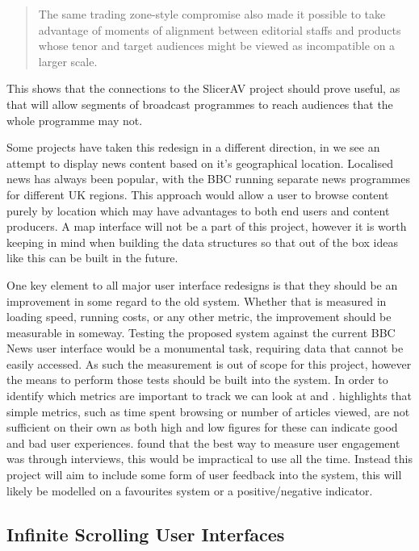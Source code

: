 \documentclass[12pt,titlepage]{article}
\begin{document}
  \begin{quote}
    The same trading zone-style compromise also made it possible to take advantage
    of moments of alignment between editorial staffs and products whose tenor and
    target audiences might be viewed as incompatible on a larger scale.
  \end{quote}

  This shows that the connections to the SlicerAV project should prove useful,
  as that will allow segments of broadcast programmes to reach audiences that
  the whole programme may not.

  Some projects have taken this redesign in a different direction, in
  \cite{newsstand} we see an attempt to display news content based on it's
  geographical location. Localised news has always been popular, with the BBC
  running separate news programmes for different UK regions. This approach would
  allow a user to browse content purely by location which may have advantages to
  both end users and content producers. A map interface will not be a part of
  this project, however it is worth keeping in mind when building the data
  structures so that out of the box ideas like this can be built in the future.

  One key element to all major user interface redesigns is that they should be
  an improvement in some regard to the old system. Whether that is measured in
  loading speed, running costs, or any other metric, the improvement should be
  measurable in someway. Testing the proposed system against the current BBC
  News user interface would be a monumental task, requiring data that cannot be
  easily accessed. As such the measurement is out of scope for this project,
  however the means to perform those tests should be built into the system. In
  order to identify which metrics are important to track we can look at
  \cite{ux} and \cite{engagement}. \cite{ux} highlights that simple metrics,
  such as time spent browsing or number of articles viewed, are not sufficient
  on their own as both high and low figures for these can indicate good and bad
  user experiences. \cite{ux} found that the best way to measure user engagement
  was through interviews, this would be impractical to use all the time. Instead
  this project will aim to include some form of user feedback into the system,
  this will likely be modelled on a favourites system or a positive/negative
  indicator.

  \subsection{Infinite Scrolling User Interfaces}
\end{document}
